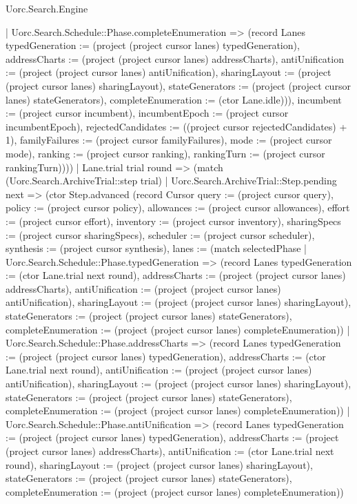 \begin{lexlean}{Uorc.Search.Engine}
\begin{semanticmodule}
{{        | Uorc.Search.Schedule::Phase.completeEnumeration => (record Lanes {typedGeneration := (project (project cursor lanes) typedGeneration), addressCharts := (project (project cursor lanes) addressCharts), antiUnification := (project (project cursor lanes) antiUnification), sharingLayout := (project (project cursor lanes) sharingLayout), stateGenerators := (project (project cursor lanes) stateGenerators), completeEnumeration := (ctor Lane.idle)})), incumbent := (project cursor incumbent), incumbentEpoch := (project cursor incumbentEpoch), rejectedCandidates := ((project cursor rejectedCandidates) + 1), familyFailures := (project cursor familyFailures), mode := (project cursor mode), ranking := (project cursor ranking), rankingTurn := (project cursor rankingTurn)})))
    | Lane.trial trial round => (match (Uorc.Search.ArchiveTrial::step trial)
      | Uorc.Search.ArchiveTrial::Step.pending next => (ctor Step.advanced (record Cursor {query := (project cursor query), policy := (project cursor policy), allowances := (project cursor allowances), effort := (project cursor effort), inventory := (project cursor inventory), sharingSpecs := (project cursor sharingSpecs), scheduler := (project cursor scheduler), synthesis := (project cursor synthesis), lanes := (match selectedPhase
        | Uorc.Search.Schedule::Phase.typedGeneration => (record Lanes {typedGeneration := (ctor Lane.trial next round), addressCharts := (project (project cursor lanes) addressCharts), antiUnification := (project (project cursor lanes) antiUnification), sharingLayout := (project (project cursor lanes) sharingLayout), stateGenerators := (project (project cursor lanes) stateGenerators), completeEnumeration := (project (project cursor lanes) completeEnumeration)})
        | Uorc.Search.Schedule::Phase.addressCharts => (record Lanes {typedGeneration := (project (project cursor lanes) typedGeneration), addressCharts := (ctor Lane.trial next round), antiUnification := (project (project cursor lanes) antiUnification), sharingLayout := (project (project cursor lanes) sharingLayout), stateGenerators := (project (project cursor lanes) stateGenerators), completeEnumeration := (project (project cursor lanes) completeEnumeration)})
        | Uorc.Search.Schedule::Phase.antiUnification => (record Lanes {typedGeneration := (project (project cursor lanes) typedGeneration), addressCharts := (project (project cursor lanes) addressCharts), antiUnification := (ctor Lane.trial next round), sharingLayout := (project (project cursor lanes) sharingLayout), stateGenerators := (project (project cursor lanes) stateGenerators), completeEnumeration := (project (project cursor lanes) completeEnumeration)})
}}
\end{semanticmodule}
\end{lexlean}
